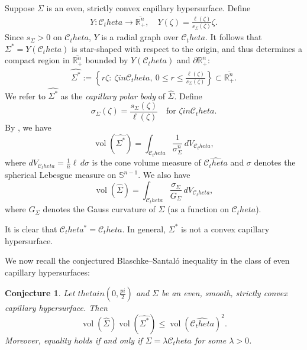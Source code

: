 \documentclass[12pt]{amsart}
\def\theta{theta}%
\def\pi{pi}%
\def\in{in }%
\newtheorem*{conj}{Conjecture}
\numberwithin{equation}{section}
\newcommand{\bbR}{\mathbb{R}}
\newcommand{\bbS}{\mathbb{S}}
\newcommand{\8}{\infty}
\newcommand{\si}{\sigma}
\DeclareMathOperator{\vol}{vol}
\renewcommand{\(}{\left(}
\renewcommand{\)}{\right)}
\newcommand{\eq}[1]{\begin{equation}\begin{alignedat}{2} #1 \end{alignedat}\end{equation}}
\newcommand{\q}{\quad}
\begin{document}
Suppose $\Sigma$ is an even, strictly convex capillary hypersurface. Define 
\eq{
Y : \mathcal{C}_\theta \to \overline{\mathbb{R}^n_+},\q Y(\zeta) = \frac{\ell(\zeta)}{s_\Sigma(\zeta)} \zeta.
}
Since $s_\Sigma>0$ on $\mathcal C_\theta$, $Y$
is a radial graph over $\mathcal C_\theta$. It follows that $\Sigma^* =Y(\mathcal C_\theta)$ is star-shaped with respect to the origin, and thus determines a compact region in $\overline{\bbR^n_+}$ bounded by $Y(\mathcal C_\theta)$ and $\partial\bbR^n_+$:
\eq{
\widehat{\Sigma^*}:=\left\{ r\zeta:\ \zeta\in\mathcal C_\theta,\ 0\le r\le \frac{\ell(\zeta)}{s_\Sigma(\zeta)}\right\}
\subset \overline{\bbR^n_+}.
}
We refer to $\widehat{\Sigma^*}$ as the \emph{capillary polar body} of $\widehat{\Sigma}$. Define
\begin{equation}
\sigma_\Sigma(\zeta) = \frac{s_\Sigma(\zeta)}{\ell(\zeta)} \quad \text{for } \zeta \in \mathcal{C}_\theta.
\end{equation}
By \cite[Prop. 2.9]{MWW25}, we have
\begin{equation}
\vol(\widehat{\Sigma^*}) = \int_{\mathcal{C}_\theta} \frac{1}{\sigma_\Sigma^n} \, dV_{\mathcal{C}_\theta},
\end{equation}
where $dV_{\mathcal{C}_\theta} = \frac{1}{n} \ell \, d\si$ is the cone volume measure of $\widehat{\mathcal{C}_\theta}$ and
$\si$ denotes the spherical Lebesgue measure on $\bbS^{n-1}$. We also have
\begin{equation}
\vol(\widehat{\Sigma}) = \int_{\mathcal{C}_\theta} \frac{\sigma_\Sigma}{G_\Sigma} \, dV_{\mathcal{C}_\theta},
\end{equation}
where $G_\Sigma$ denotes the Gauss curvature of $\Sigma$ (as a function on $\mathcal{C}_\theta$).


\begin{remark}
It is clear that $\mathcal{C}_\theta^* = \mathcal{C}_\theta$. In general, $\Sigma^*$ is not a convex capillary hypersurface.
\end{remark}
We now recall the conjectured Blaschke--Santal\'{o} inequality in the class of even capillary hypersurfaces:

\begin{conj}\cite{MWW25}
Let $\theta \in (0, \frac{\pi}{2})$ and $\Sigma$ be an even, smooth, strictly convex capillary hypersurface. Then
\begin{equation}\label{conj}
\vol(\widehat{\Sigma}) \vol(\widehat{\Sigma^*}) \leq \vol(\widehat{\mathcal{C}_\theta})^2.
\end{equation}
Moreover, equality holds if and only if $\Sigma = \lambda \mathcal{C}_\theta$ for some $\lambda > 0$.
\end{conj}
\end{document}
